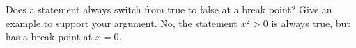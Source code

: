 {Does a statement always switch from true to false at a break point? Give an example to support your argument.}
{No, the statement $x^2 >0$ is always true, but has a break point at $x=0$.}
